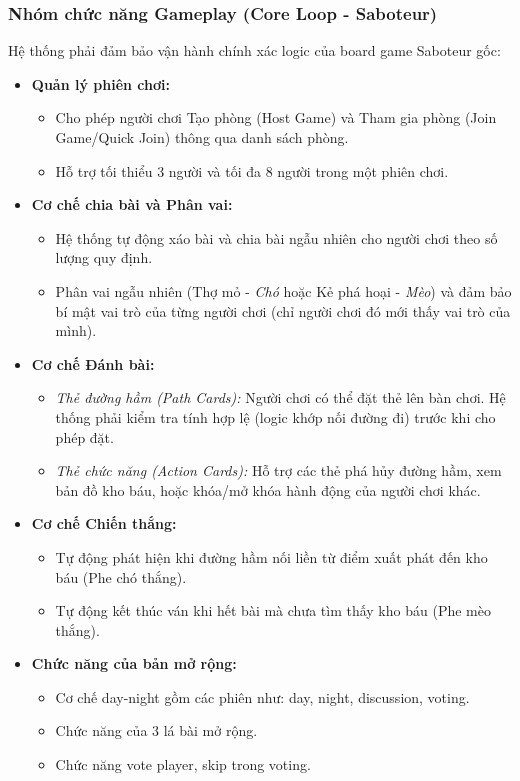 \subsubsection{Nhóm chức năng Gameplay (Core Loop - Saboteur)}
Hệ thống phải đảm bảo vận hành chính xác logic của board game Saboteur gốc:
\begin{itemize}
    \item \textbf{Quản lý phiên chơi:}
        \begin{itemize}
            \item Cho phép người chơi Tạo phòng (Host Game) và Tham gia phòng (Join Game/Quick Join) thông qua danh sách phòng.
            \item Hỗ trợ tối thiểu 3 người và tối đa 8 người trong một phiên chơi.
        \end{itemize}
    \item \textbf{Cơ chế chia bài và Phân vai:}
        \begin{itemize}
            \item Hệ thống tự động xáo bài và chia bài ngẫu nhiên cho người chơi theo số lượng quy định.
            \item Phân vai ngẫu nhiên (Thợ mỏ - \textit{Chó} hoặc Kẻ phá hoại - \textit{Mèo}) và đảm bảo bí mật vai trò của từng người chơi (chỉ người chơi đó mới thấy vai trò của mình).
        \end{itemize}
    \item \textbf{Cơ chế Đánh bài:}
        \begin{itemize}
            \item \textit{Thẻ đường hầm (Path Cards):} Người chơi có thể đặt thẻ lên bàn chơi. Hệ thống phải kiểm tra tính hợp lệ (logic khớp nối đường đi) trước khi cho phép đặt.
            \item \textit{Thẻ chức năng (Action Cards):} Hỗ trợ các thẻ phá hủy đường hầm, xem bản đồ kho báu, hoặc khóa/mở khóa hành động của người chơi khác.
        \end{itemize}
    \item \textbf{Cơ chế Chiến thắng:}
        \begin{itemize}
            \item Tự động phát hiện khi đường hầm nối liền từ điểm xuất phát đến kho báu (Phe chó thắng).
            \item Tự động kết thúc ván khi hết bài mà chưa tìm thấy kho báu (Phe mèo thắng).
        \end{itemize}
    \item \textbf{Chức năng của bản mở rộng:}
        \begin{itemize}
            \item Cơ chế day-night gồm các phiên như: day, night, discussion, voting.
            \item Chức năng của 3 lá bài mở rộng.
            \item Chức năng vote player, skip trong voting.
        \end{itemize}
\end{itemize}

